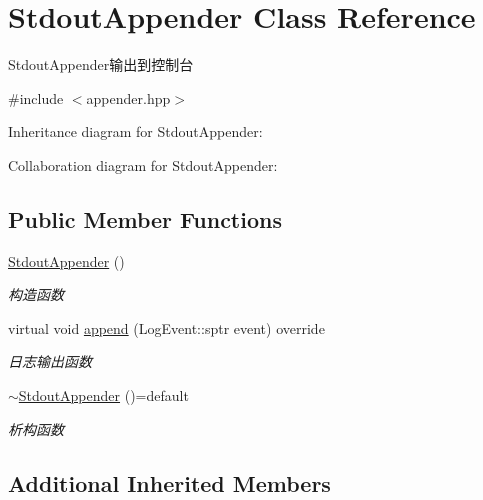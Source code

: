 \hypertarget{classStdoutAppender}{}\section{Stdout\+Appender Class Reference}
\label{classStdoutAppender}


Stdout\+Appender输出到控制台  




{\ttfamily \#include $<$appender.\+hpp$>$}



Inheritance diagram for Stdout\+Appender\+:


Collaboration diagram for Stdout\+Appender\+:
\subsection*{Public Member Functions}
\begin{DoxyCompactItemize}
\item 
\mbox{\label{classStdoutAppender_aa3155f958f688e0bee44e7b98a013ce8}} 
\hyperlink{classStdoutAppender_aa3155f958f688e0bee44e7b98a013ce8}{Stdout\+Appender} ()
\begin{DoxyCompactList}\small\item\em 构造函数 \end{DoxyCompactList}\item 
virtual void \hyperlink{classStdoutAppender_aadfb0bdcef0b192bee7ccab70ee6502b}{append} (Log\+Event\+::sptr event) override
\begin{DoxyCompactList}\small\item\em 日志输出函数 \end{DoxyCompactList}\item 
\mbox{\label{classStdoutAppender_a7bd40462037caa97df1841c9252a9739}} 
\hyperlink{classStdoutAppender_a7bd40462037caa97df1841c9252a9739}{$\sim$\+Stdout\+Appender} ()=default
\begin{DoxyCompactList}\small\item\em 析构函数 \end{DoxyCompactList}\end{DoxyCompactItemize}
\subsection*{Additional Inherited Members}


